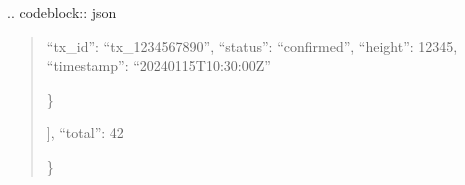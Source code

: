 \documentclass[letterpaper,10pt,english]{sphinxmanual}
\begin{document}
\sphinxAtStartPar
{}
.. code\sphinxhyphen{}block:: json
\begin{quote}
\begin{description}
\sphinxlineitem{\{}\begin{description}
\sphinxlineitem{“transactions”: {[}}\begin{description}
\sphinxlineitem{\{}
\sphinxAtStartPar
“tx\_id”: “tx\_1234567890”,
“status”: “confirmed”,
“height”: 12345,
“timestamp”: “2024\sphinxhyphen{}01\sphinxhyphen{}15T10:30:00Z”

\end{description}

\sphinxAtStartPar
\}

\end{description}

\sphinxAtStartPar
{]},
“total”: 42

\end{description}

\sphinxAtStartPar
\}
\end{quote}
\end{document}

